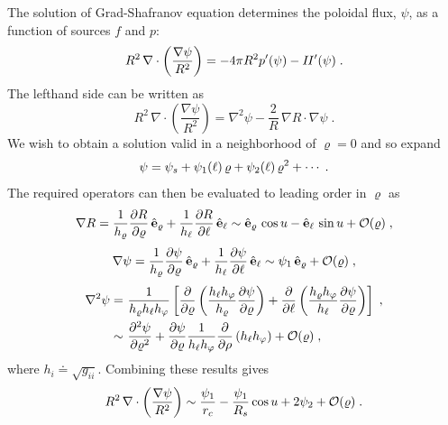 The solution of Grad-Shafranov equation determines 
the poloidal flux, $\psi$, as a function of sources 
$f$ and $p$:
%
\begin{equation}
R^2 \, \nabla\cdot\left( \frac{\nabla\psi}{R^2} \right) 
= -4\pi R^2 p^\prime(\psi) - I\hskip -1pt I^\prime(\psi) \; .
\end{equation}
%
The lefthand side can be written as 
%
\begin{equation}
R^2 \, \nabla\cdot\left( \frac{\nabla\psi}{R^2} \right)
= \nabla^2\psi - \frac{2}{R} \, \nabla R \cdot \nabla \psi \; .
\end{equation}
%
We wish to obtain a solution valid in a neighborhood of 
$\varrho=0$ and so expand
%
\begin{equation}
\psi = \psi_s + \psi_1(\ell) \, \varrho + \psi_2(\ell) \, \varrho^2 + \cdots 
\; . \label{eq.psi}
\end{equation}
%
The required operators can then be evaluated to leading
order in $\varrho$ as
%
\begin{equation}
\nabla R = \frac{1}{h_\varrho} \frac{\partial R}{\partial\varrho}\,\hat{\mathbf{e}}_\varrho +
  \frac{1}{h_\ell} \frac{\partial R}{\partial\ell}\,\hat{\mathbf{e}}_\ell 
  \sim \hat{\mathbf{e}}_\varrho\,\cos u  - \hat{\mathbf{e}}_\ell\,\sin u 
  + {\mathcal O}(\varrho) \; ,
\end{equation}
\begin{equation}
\nabla \psi = \frac{1}{h_\varrho} 
  \frac{\partial\psi}{\partial\varrho}\,\hat{\mathbf{e}}_\varrho +
  \frac{1}{h_\ell} \frac{\partial\psi}{\partial\ell}\,\hat{\mathbf{e}}_\ell 
  \sim \psi_1 \, \hat{\mathbf{e}}_\varrho + {\mathcal O}(\varrho) \; ,
\end{equation}
\begin{align}
\nabla^2 \psi = &~\frac{1}{h_\varrho h_\ell h_\varphi} \left[ 
  \frac{\partial}{\partial\varrho}\left( \frac{h_\ell h_\varphi}{h_\varrho} 
  \frac{\partial\psi}{\partial\varrho} \right)+
  \frac{\partial}{\partial\ell}\left( \frac{h_\varrho h_\varphi}{h_\ell} 
  \frac{\partial\psi}{\partial\varrho} \right) \right] \; , \\
\qquad \sim &~\frac{\partial^2\psi}{\partial\varrho^2} 
  + \frac{\partial\psi}{\partial\varrho}\frac{1}{h_\ell h_\varphi}
\frac{\partial}{\partial\rho}\left( h_\ell h_\varphi \right) 
 + {\mathcal O}(\varrho) \; ,
\end{align}
%
where $h_i \doteq \sqrt{g_{ii}}$.  Combining these results gives
%
\begin{equation}
R^2 \, \nabla\cdot\left( \frac{\nabla\psi}{R^2} \right) \sim 
\frac{\psi_1}{r_c}-\frac{\psi_1}{R_s}\cos u + 2\psi_2 + {\mathcal O}(\varrho) \; .
\end{equation}
